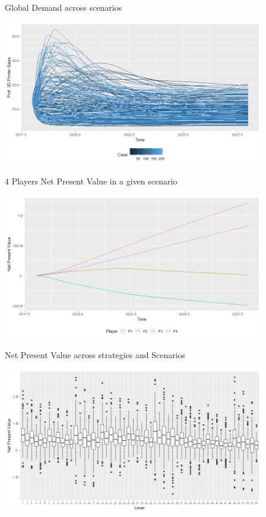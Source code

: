 \documentclass[12pt,ignorenonframetext,]{beamer}
\begin{document}
\begin{frame}{Global Demand across scenarios}
\protect\hypertarget{global-demand-across-scenarios}{}

\centerline{\includegraphics[height=2.5in]{images/sales.png}}

\end{frame}

\begin{frame}{4 Players Net Present Value in a given scenario}
\protect\hypertarget{players-net-present-value-in-a-given-scenario}{}

\centerline{\includegraphics[height=2.5in]{images/npv-players.png}}

\end{frame}

\begin{frame}{Net Present Value across strategies and Scenarios}
\protect\hypertarget{net-present-value-across-strategies-and-scenarios}{}

\centerline{\includegraphics[height=2.5in]{images/npv-whisker.png}}

\end{frame}
\end{document}
